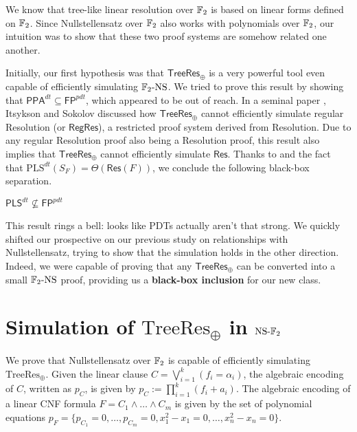 We know that tree-like linear resolution over $\mathbb{F}_2$ is based on linear forms defined on $\mathbb{F}_2$. Since Nullstellensatz over $\mathbb{F}_2$ also works with polynomials over $\mathbb{F}_2$, our intuition was to show that these two proof systems are somehow related one another.

Initially, our first hypothesis was that $\mathsf{TreeRes}_\oplus$ is a very powerful tool even capable of efficiently simulating $\mathrm{\mathbb{F}_2\text{-}NS}$. We tried to prove this result by showing that $\mathsf{PPA}^{dt} \subseteq \mathsf{FP}^{pdt}$, which appeared to be out of reach. In a seminal paper \cite{res_lin_2}, Itsykson and Sokolov discussed how $\mathsf{TreeRes}_\oplus$ cannot efficiently simulate regular Resolution (or $\mathsf{RegRes}$), a restricted proof system derived from Resolution. Due to any regular Resolution proof also being a Resolution proof, this result also implies that $\mathsf{TreeRes}_\oplus$ cannot efficiently simulate $\mathsf{Res}$. Thanks to  and the fact that $\mathrm{PLS}^{dt}(S_F) = \Theta(\mathsf{Res}(F))$, we conclude the following black-box separation.

\begin{proposition}
    $\mathsf{PLS}^{dt} \not\subseteq \mathsf{FP}^{pdt}$
\end{proposition}

This result rings a bell: looks like PDTs actually aren't that strong. We quickly shifted our prospective on our previous study on relationships with Nullstellensatz, trying to show that the simulation holds in the other direction. Indeed, we were capable of proving that any $\mathsf{TreeRes}_\oplus$ can be converted into a small $\mathrm{\mathbb{F}_2\text{-}NS}$ proof, providing us a \textbf{black-box inclusion} for our new class.

\section{Simulation of $\mathrm{TreeRes}_\oplus$ in $\mathrm{NS\text{-}}\mathbb{F}_2$}

We prove that Nullstellensatz over $\mathbb{F}_2$ is capable of efficiently simulating $\mathrm{TreeRes}_\oplus$. Given the linear clause $C = \bigvee_{i = 1}^k (f_i = \alpha_i)$, the algebraic encoding of $C$, written as $p_C$, is given by $p_C := \prod_{i = 1}^{k} (f_i + a_i)$. The algebraic encoding of a linear CNF formula $F = C_1 \land \ldots \land C_m$ is given by the set of polynomial equations $p_F = \{p_{C_1} = 0, \ldots, p_{C_m} = 0, x_1^2-x_1 = 0, \ldots, x_n^2-x_n = 0\}$.

